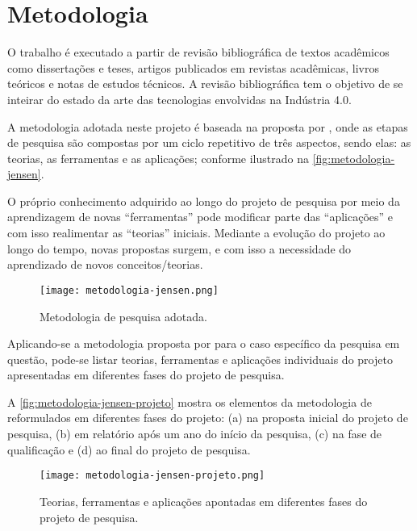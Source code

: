 \section{Metodologia}
\label{sec:metodologia}

O trabalho é executado a partir de revisão bibliográfica de textos acadêmicos como dissertações e teses, artigos publicados em revistas acadêmicas, livros teóricos e notas de estudos técnicos. A revisão bibliográfica tem o objetivo de se inteirar do estado da arte das tecnologias envolvidas na Indústria 4.0.

A metodologia adotada neste projeto é baseada na proposta por , onde as etapas de pesquisa são compostas por um ciclo repetitivo de três aspectos, sendo elas: as teorias, as ferramentas e as aplicações; conforme ilustrado na \autoref{fig:metodologia-jensen}.

O próprio conhecimento adquirido ao longo do projeto de pesquisa por meio da aprendizagem de novas ``ferramentas'' pode modificar parte das ``aplicações'' e com isso realimentar as ``teorias'' iniciais. Mediante a evolução do projeto ao longo do tempo, novas propostas surgem, e com isso a necessidade do aprendizado de novos conceitos/teorias.

\begin{figure}[htb]
	\centering
	\texttt{[image: metodologia-jensen.png]}
	\caption{Metodologia de pesquisa adotada.}
	\label{fig:metodologia-jensen}
\end{figure}

Aplicando-se a metodologia proposta por  para o caso específico da pesquisa em questão, pode-se listar teorias, ferramentas e aplicações individuais do projeto apresentadas em diferentes fases do projeto de pesquisa.

A \autoref{fig:metodologia-jensen-projeto} mostra os elementos da metodologia de  reformulados em diferentes fases do projeto: (a) na proposta inicial do projeto de pesquisa, (b) em relatório após um ano do início da pesquisa, (c) na fase de qualificação e (d) ao final do projeto de pesquisa.

\begin{figure}[htb]
	\centering
	\texttt{[image: metodologia-jensen-projeto.png]}
	\caption{Teorias, ferramentas e aplicações apontadas em diferentes fases do projeto de pesquisa.}
	\label{fig:metodologia-jensen-projeto}
\end{figure}

